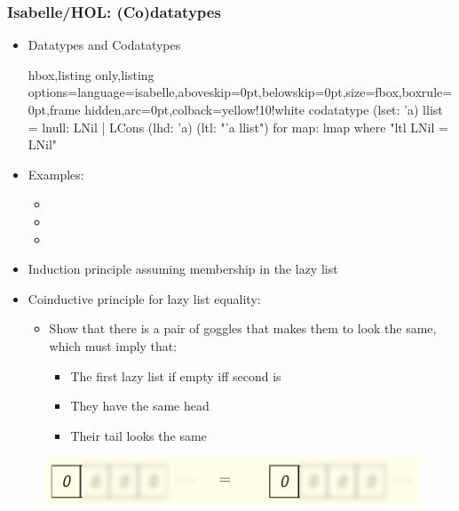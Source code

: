 \documentclass[aspectratio=169,10pt]{beamer}
\begin{document}
\begin{frame}
  \frametitle{Isabelle/HOL: (Co)datatypes}
  \begin{itemize}
    \item Datatypes and Codatatypes
          \begin{tcblisting}{hbox,listing only,listing options={language=isabelle,aboveskip=0pt,belowskip=0pt},size=fbox,boxrule=0pt,frame hidden,arc=0pt,colback=yellow!10!white}
            codatatype (lset: 'a) llist = lnull: LNil | LCons (lhd: 'a) (ltl: "'a llist")
            for map: lmap where "ltl LNil = LNil"
          \end{tcblisting}
    \item Examples:
          \begin{itemize}
            \item {}
            \item {}
            \item {}
          \end{itemize}
    \item Induction principle assuming membership in the lazy list
    \item Coinductive principle for lazy list equality:
          \begin{itemize}
            \item Show that there is a pair of goggles that makes them to look the same, which must imply that:
                  \begin{itemize}
                    \item The first lazy list if empty iff second is
                    \item They have the same head
                    \item Their tail looks the same
                  \end{itemize}
          \end{itemize}
  \end{itemize}
  \begin{figure}
    \centering
    \includegraphics[scale=0.4]{equality_2.png}
  \end{figure}
\end{frame}
\end{document}
